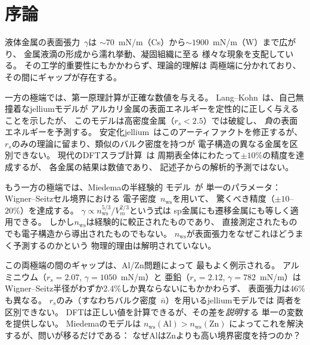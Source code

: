 \documentclass[twocolumn,showpacs,preprintnumbers,amsmath,amssymb,prb]{revtex4-2}
\begin{document}

\maketitle


\section{序論}
\label{sec:intro}

液体金属の表面張力~$\gamma$は
$\sim\!70$~mN/m（Cs）から$\sim\!1900$~mN/m（W）まで広がり、
金属液滴の形成から濡れ挙動、凝固組織に至る
様々な現象を支配している。
その工学的重要性にもかかわらず、理論的理解は
両極端に分かれており、その間にギャップが存在する。

一方の極端では、第一原理計算が正確な数値を与える。
Lang--Kohn~\cite{LangKohn1970}は、自己無撞着なjelliumモデルが
アルカリ金属の表面エネルギーを定性的に正しく与えることを示したが、
このモデルは高密度金属（$r_s < 2.5$）では破綻し、
\emph{負}の表面エネルギーを予測する。
安定化jellium~\cite{Perdew1990}はこのアーティファクトを修正するが、
$r_s$のみの理論に留まり、類似のバルク密度を持つが
電子構造の異なる金属を区別できない。
現代のDFTスラブ計算~\cite{Vitos1998,SinghMiller2009,Tran2016}は
周期表全体にわたって$\pm 10\%$の精度を達成するが、
各金属の結果は数値であり、
記述子からの解析的予測ではない。

もう一方の極端では、Miedemaの半経験的
モデル~\cite{Miedema1978,deBoer1988}が
単一のパラメータ：Wigner--Seitzセル境界における
電子密度~$n_\mathrm{ws}$を用いて、
驚くべき精度（$\pm 10$--$20\%$）を達成する。
$\gamma \propto n_\mathrm{ws}^{5/3} / V_m^{2/3}$という式は
sp金属にも遷移金属にも等しく適用できる。
しかし$n_\mathrm{ws}$は経験的に較正されたものであり、
直接測定されたものでも電子構造から導出されたものでもない。
$n_\mathrm{ws}$が表面張力をなぜこれほどうまく予測するのかという
物理的理由は解明されていない。

この両極端の間のギャップは、Al/Zn問題によって
最もよく例示される。
アルミニウム（$r_s = 2.07$, $\gamma = 1050$~mN/m）と
亜鉛（$r_s = 2.12$, $\gamma = 782$~mN/m）は
Wigner--Seitz半径がわずか2.4\%しか異ならないにもかかわらず、
表面張力は46\%も異なる。
$r_s$のみ（すなわちバルク密度~$\bar{n}$）を用いるjelliumモデルでは
両者を区別できない。
DFTは正しい値を計算できるが、その差を\emph{説明}する
単一の変数を提供しない。
Miedemaのモデルは
$n_\mathrm{ws}(\mathrm{Al}) > n_\mathrm{ws}(\mathrm{Zn})$
によってこれを解決するが、問いが移るだけである：
なぜAlはZnよりも高い境界密度を持つのか？
\end{document}
